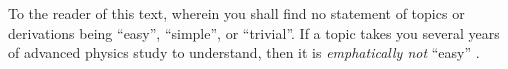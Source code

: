 To the reader of this text, wherein you shall find no statement of topics or
derivations being ``easy'', ``simple'', or ``trivial''.
If a topic takes you several years of advanced physics study to understand, then
it is \emph{emphatically not} ``easy'' \cite{nontrivial-manifesto}.
